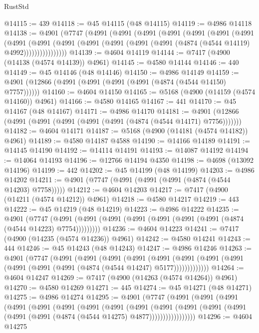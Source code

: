 \begin{lexlean}{RustStd}
\begin{coremodule}
@14115 := 439
@14118 := @45 @14115 (@48 @14115)
@14119 := @4986 @14118
@14138 := @4901
    (@7747
      (@4991
        (@4991
          (@4991
            (@4991
              (@4991
                (@4991
                  (@4991
                    (@4991
                      (@4991
                        (@4991
                          (@4991 (@4991 (@4991 (@4991 (@4874 (@4544 @14119) @4992))))))))))))))))
@14139 := @4604 @14119
@14144 := @7417 (@4900 (@14138 (@4574 @14139)) @4961)
@14145 := @4580 @14144
@14146 := 440
@14149 := @45 @14146 (@48 @14146)
@14150 := @4986 @14149
@14159 := @4901 (@12866 (@4991 (@4991 (@4991 (@4991 (@4874 (@4544 @14150) @7757))))))
@14160 := @4604 @14150
@14165 := @5168 (@4900 (@14159 (@4574 @14160)) @4961)
@14166 := @4580 @14165
@14167 := 441
@14170 := @45 @14167 (@48 @14167)
@14171 := @4986 @14170
@14181 := @4901 (@12866 (@4991 (@4991 (@4991 (@4991 (@4991 (@4874 (@4544 @14171) @7756)))))))
@14182 := @4604 @14171
@14187 := @5168 (@4900 (@14181 (@4574 @14182)) @4961)
@14189 := @4580 @14187 @4588
@14190 := @14166 @14189
@14191 := @14145 @14190
@14192 := @14114 @14191
@14193 := @14087 @14192
@14194 := @14064 @14193
@14196 := @12766 @14194 @4350
@14198 := @4698 (@13092 @14196)
@14199 := 442
@14202 := @45 @14199 (@48 @14199)
@14203 := @4986 @14202
@14211 := @4901 (@7747 (@4991 (@4991 (@4991 (@4874 (@4544 @14203) @7758)))))
@14212 := @4604 @14203
@14217 := @7417 (@4900 (@14211 (@4574 @14212)) @4961)
@14218 := @4580 @14217
@14219 := 443
@14222 := @45 @14219 (@48 @14219)
@14223 := @4986 @14222
@14235 := @4901
    (@7747 (@4991 (@4991 (@4991 (@4991 (@4991 (@4991 (@4991 (@4874 (@4544 @14223) @7754)))))))))
@14236 := @4604 @14223
@14241 := @7417 (@4900 (@14235 (@4574 @14236)) @4961)
@14242 := @4580 @14241
@14243 := 444
@14246 := @45 @14243 (@48 @14243)
@14247 := @4986 @14246
@14263 := @4901
    (@7747
      (@4991
        (@4991
          (@4991
            (@4991
              (@4991
                (@4991 (@4991 (@4991 (@4991 (@4991 (@4991 (@4874 (@4544 @14247) @5177)))))))))))))
@14264 := @4604 @14247
@14269 := @7417 (@4900 (@14263 (@4574 @14264)) @4961)
@14270 := @4580 @14269
@14271 := 445
@14274 := @45 @14271 (@48 @14271)
@14275 := @4986 @14274
@14295 := @4901
    (@7747
      (@4991
        (@4991
          (@4991
            (@4991
              (@4991
                (@4991
                  (@4991
                    (@4991
                      (@4991
                        (@4991
                          (@4991
                            (@4991 (@4991 (@4991 (@4991 (@4874 (@4544 @14275) @4877)))))))))))))))))
@14296 := @4604 @14275

\end{coremodule}
\end{lexlean}
